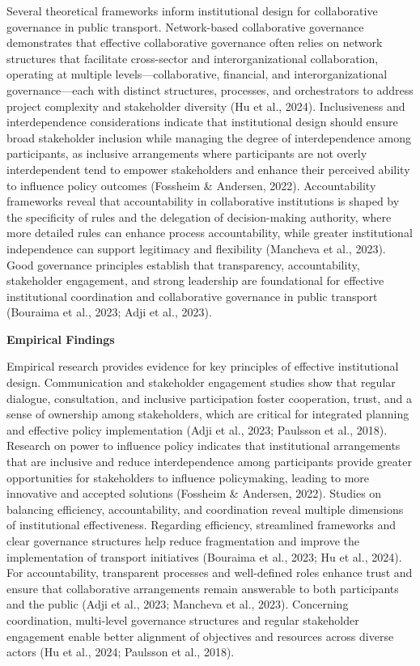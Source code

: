 Several theoretical frameworks inform institutional design for collaborative governance in public transport. Network-based collaborative governance demonstrates that effective collaborative governance often relies on network structures that facilitate cross-sector and interorganizational collaboration, operating at multiple levels---collaborative, financial, and interorganizational governance---each with distinct structures, processes, and orchestrators to address project complexity and stakeholder diversity (Hu et al., 2024). Inclusiveness and interdependence considerations indicate that institutional design should ensure broad stakeholder inclusion while managing the degree of interdependence among participants, as inclusive arrangements where participants are not overly interdependent tend to empower stakeholders and enhance their perceived ability to influence policy outcomes (Fossheim \& Andersen, 2022). Accountability frameworks reveal that accountability in collaborative institutions is shaped by the specificity of rules and the delegation of decision-making authority, where more detailed rules can enhance process accountability, while greater institutional independence can support legitimacy and flexibility (Mancheva et al., 2023). Good governance principles establish that transparency, accountability, stakeholder engagement, and strong leadership are foundational for effective institutional coordination and collaborative governance in public transport (Bouraima et al., 2023; Adji et al., 2023).

\textbf{Empirical Findings}

Empirical research provides evidence for key principles of effective institutional design. Communication and stakeholder engagement studies show that regular dialogue, consultation, and inclusive participation foster cooperation, trust, and a sense of ownership among stakeholders, which are critical for integrated planning and effective policy implementation (Adji et al., 2023; Paulsson et al., 2018). Research on power to influence policy indicates that institutional arrangements that are inclusive and reduce interdependence among participants provide greater opportunities for stakeholders to influence policymaking, leading to more innovative and accepted solutions (Fossheim \& Andersen, 2022). Studies on balancing efficiency, accountability, and coordination reveal multiple dimensions of institutional effectiveness. Regarding efficiency, streamlined frameworks and clear governance structures help reduce fragmentation and improve the implementation of transport initiatives (Bouraima et al., 2023; Hu et al., 2024). For accountability, transparent processes and well-defined roles enhance trust and ensure that collaborative arrangements remain answerable to both participants and the public (Adji et al., 2023; Mancheva et al., 2023). Concerning coordination, multi-level governance structures and regular stakeholder engagement enable better alignment of objectives and resources across diverse actors (Hu et al., 2024; Paulsson et al., 2018).

